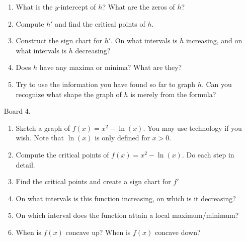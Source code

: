 \documentclass[10pt]{article}
\begin{document}
\begin{enumerate}
\begin{enumerate}
    \item What is the $y$-intercept of $h$? What are the zeros of $h$?
    \item Compute $h'$ and find the critical points of $h$. 
    \item Construct the sign chart for $h'$. On what intervals is $h$ increasing, and on what intervals is $h$ decreasing? 
    \item Does $h$ have any maxima or minima? What are they?
    \item Try to use the information you have found so far to graph $h$. Can you recognize what shape the graph of $h$ is merely from the formula? 
\end{enumerate}
\newpage
\item[Board 4.] \, 
\begin{enumerate}
    \item Sketch a graph of $f(x)=x^{2}-\ln(x).$ You may use technology if you wish. Note that $\ln(x)$ is only defined for $x > 0$. 
    \item Compute the critical points of $f(x)=x^{2}-\ln(x).$ Do each step in detail. 
    \item Find the critical points and create a sign chart for $f'$
    \item On what intervals is this function increasing, on which is it decreasing? 
    \item On which interval does the function attain a local maximum/minimum?
    \item When is $f(x)$ concave up? When is $f(x)$ concave down? 
\end{enumerate}


\end{enumerate}
\end{document}
